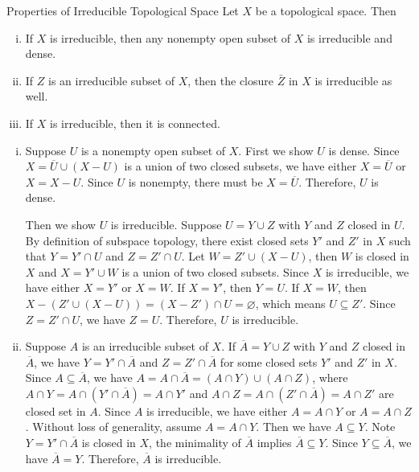 \documentclass{report}
\begin{document}
\begin{proposition}{Properties of Irreducible Topological Space}{}
	Let $X$ be a topological space. Then
	\begin{enumerate}[(i)]
		\item If $X$ is irreducible, then any nonempty open subset of $X$ is irreducible and dense.
		\item If $Z$ is an irreducible subset of $X$, then the closure $\bar{Z}$ in $X$ is irreducible as well.
		\item If $X$ is irreducible, then it is connected.
	\end{enumerate}
\end{proposition}
\begin{prf}

	\begin{enumerate}[(i)]
		\item Suppose $U$ is a nonempty open subset of $X$. First we show $U$ is dense. Since $X=\overline{U}\cup (X-U)$ is a union of two closed subsets, we have either $X=\overline{U}$ or $X=X-U$. Since $U$ is nonempty, there must be $X=\overline{U}$. Therefore, $U$ is dense.
		
		Then we show $U$ is irreducible. Suppose $U=Y\cup Z$ with $Y$ and $Z$ closed in $U$. By definition of subspace topology, there exist closed sets $Y'$ and $Z'$ in $X$ such that $Y=Y'\cap U$ and $Z=Z'\cap U$. Let $W=Z'\cup (X-U)$, then $W$ is closed in $X$ and $X=Y'\cup W$ is a union of two closed subsets. Since $X$ is irreducible, we have either $X=Y'$ or $X=W$. If $X=Y'$, then $Y=U$. If $X=W$, then $X-(Z'\cup (X-U))=(X-Z')\cap U=\varnothing$, which means $U\subseteq Z'$. Since $Z=Z'\cap U$, we have $Z=U$. Therefore, $U$ is irreducible.
		\item Suppose $A$ is an irreducible subset of $X$. If $\overline{A}=Y\cup Z$ with $Y$ and $Z$ closed in $\overline{A}$, we have $Y=Y'\cap \overline{A}$ and $Z=Z'\cap \overline{A}$ for some closed sets $Y'$ and $Z'$ in $X$. Since $A\subseteq \overline{A}$, we have $A=A\cap \overline{A}=(A\cap Y)\cup (A\cap Z)$, where $A \cap Y = A \cap (Y'\cap \overline{A})=A \cap Y'$ and $A \cap Z = A \cap (Z'\cap \overline{A})=A \cap Z'$ are closed set in $A$. Since $A$ is irreducible, we have either $A=A\cap Y$ or $A=A\cap Z$. Without loss of generality, assume $A=A\cap Y$. Then we have $A\subseteq Y$. Note $Y=Y'\cap \overline{A}$ is closed in $X$, the minimality of $\overline{A}$ implies $\overline{A}\subseteq Y$. Since $Y\subseteq \overline{A}$, we have $\overline{A}=Y$. Therefore, $\overline{A}$ is irreducible.
	\end{enumerate}
\end{prf}
\end{document}
